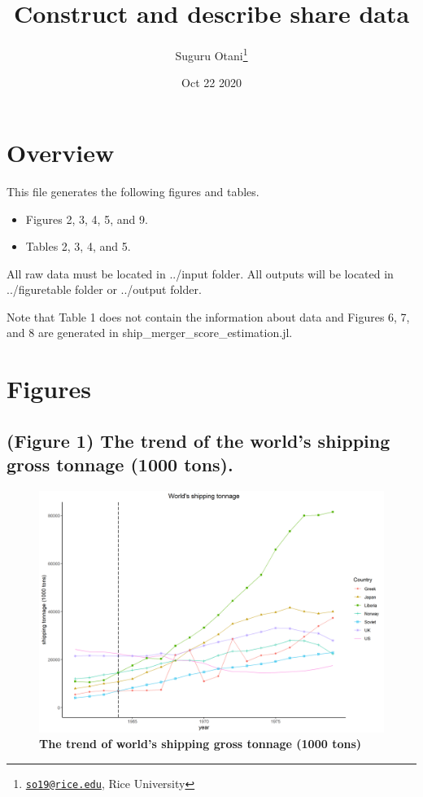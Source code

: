 \documentclass[
  10pt,
]{article}
\title{Construct and describe share data}
\author{Suguru Otani\footnote{\href{mailto:so19@rice.edu}{\nolinkurl{so19@rice.edu}},
  Rice University}}
\date{Oct 22 2020}
\providecommand{\tightlist}{%
  \setlength{\itemsep}{0pt}\setlength{\parskip}{0pt}}
\begin{document}
\maketitle

\hypertarget{overview}{%
\section{Overview}\label{overview}}

This file generates the following figures and tables.

\begin{itemize}
\tightlist
\item
  Figures 2, 3, 4, 5, and 9.
\item
  Tables 2, 3, 4, and 5.
\end{itemize}

All raw data must be located in ../input folder. All outputs will be
located in ../figuretable folder or ../output folder.

Note that Table 1 does not contain the information about data and
Figures 6, 7, and 8 are generated in ship\_merger\_score\_estimation.jl.

\hypertarget{figures}{%
\section{Figures}\label{figures}}

\hypertarget{figure-1-the-trend-of-the-worlds-shipping-gross-tonnage-1000-tons.}{%
\subsection{(Figure 1) The trend of the world's shipping gross tonnage
(1000
tons).}\label{figure-1-the-trend-of-the-worlds-shipping-gross-tonnage-1000-tons.}}

\begin{figure}[!ht]
\begin{center}
\includegraphics[height = 0.37\textheight]{../figuretable/shippingtonnage.png}
\end{center}
\caption{\textbf{The trend of world's shipping gross tonnage (1000 tons)}}
\label{fg:shippingtonnage}
\end{figure}
\end{document}
